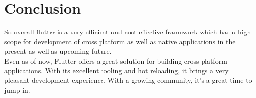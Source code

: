 \chapter{Conclusion}
So overall flutter is a very efficient and cost effective framework which
has a high scope for development of cross platform as well as native
applications in the present as well as upcoming future.\\
Even as of now, Flutter offers a great solution for building cross-platform applications. With its
excellent tooling and hot reloading, it brings a very pleasant development experience. With a
growing community, it’s a great time to jump in.
